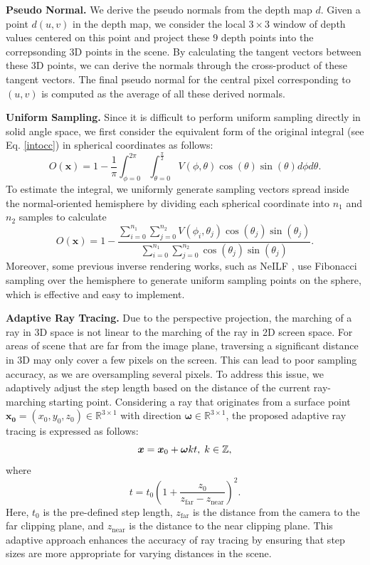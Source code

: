 \documentclass{article} %
\begin{document}
\textbf{Pseudo Normal.} We derive the pseudo normals from the depth map $d$. Given a point $d(u,v)$ in the depth map, we consider the local $3\times3$ window of depth values centered on this point and project these $9$ depth points into the correpsonding 3D points in the scene. By calculating the tangent vectors between these 3D points, we can derive the normals through the cross-product of these tangent vectors. The final pseudo normal for the central pixel corresponding to $(u,v)$ is computed as the average of all these derived normals.

\textbf{Uniform Sampling.}
Since it is difficult to perform uniform sampling directly in solid angle space, we first consider the equivalent form of the original integral (see Eq. \ref{intocc}) in spherical coordinates as follows:
\begin{equation}
    O(\boldsymbol{x})=1-\frac{1}{\pi} \int_{\phi=0}^{2 \pi} \int_{\theta=0}^{\frac{\pi}{2}} V(\phi, \theta) \cos (\theta) \sin (\theta) d \phi d \theta .
\end{equation}
To estimate the integral, we uniformly generate sampling vectors spread inside the normal-oriented
hemisphere by dividing each spherical coordinate into $n_1$ and $n_2$ samples to calculate
\begin{equation}
    O(\boldsymbol{x})=1-\frac{\sum_{i=0}^{n_1} \sum_{j=0}^{n_2} V\left(\phi_i, \theta_j\right) \cos \left(\theta_j\right) \sin \left(\theta_j\right)}{\sum_{i=0}^{n_1} \sum_{j=0}^{n_2} \cos \left(\theta_j\right) \sin \left(\theta_j\right)}.
\end{equation}
Moreover, some previous inverse rendering works, such as NeILF \citep{yao2022neilf}, use Fibonacci sampling over the hemisphere to generate uniform sampling points on the sphere, which is effective and easy to implement.

\textbf{Adaptive Ray Tracing.}
Due to the perspective projection, the marching of a ray in 3D space is not linear to the marching of the ray in 2D screen space. For areas of scene that are far from the image plane, traversing a significant distance in 3D may only cover a few pixels on the screen. This can lead to poor sampling accuracy, as we are oversampling several pixels. To address this issue, we adaptively adjust the step length based on the distance of the current ray-marching starting point. Considering a ray that originates from a surface point $\boldsymbol{x_0}=(x_0,y_0,z_0)\in \mathbb{R}^{3 \times 1}$ with direction $\bm{\omega}\in \mathbb{R}^{3 \times 1}$, the proposed adaptive ray tracing is expressed as follows:
\begin{equation}
    {\bm{x}} = {\bm{x}}_0 + \bm{\omega}kt, \; k\in \mathbb{Z},
\end{equation}
where
\begin{equation}
    t  = t_0 \left(1+\frac{z_0}{z_{\text{far}}-z_{\text{near}}} \right)^2.
\end{equation}
Here, $t_0$ is the pre-defined step length, $z_{\text{far}}$ is the distance from the camera to the far clipping plane, and $z_{\text{near}}$ is the distance to the near clipping plane.  This adaptive approach enhances the accuracy of ray tracing by ensuring that step sizes are more appropriate for varying distances in the scene.
\end{document}
